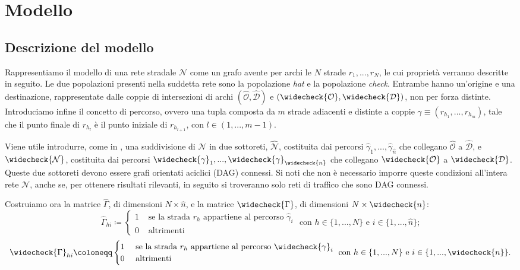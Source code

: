 \section{Modello}
\label{sec:Modello}
\subsection{Descrizione del modello}
\label{subsec:DescModello}

Rappresentiamo il modello di una rete stradale $\mathcal{N}$ come un grafo avente per archi le $N$ strade $r_1,...,r_N$,
le cui proprietà verranno descritte in seguito. Le due popolazioni presenti nella suddetta rete sono 
la popolazione \textit{hat} e la popolazione \textit{check}. Entrambe hanno un'origine e una destinazione, rappresentate
dalle coppie di intersezioni di archi $(\widehat{\mathcal{O}}, \widehat{\mathcal{D}})$ e $(\widecheck{\mathcal{O}}, \widecheck{\mathcal{D}})$, non per forza distinte.
Introduciamo infine il concetto di percorso, ovvero una tupla composta da $m$ strade adiacenti e distinte
a coppie $\gamma\equiv(r_{h_1},...,r_{h_m})$, tale che il punto finale di $r_{h_l}$ è il punto iniziale di 
$r_{h_{l+1}}$, con $l\in(1,...,m-1)$.

Viene utile introdurre, come in \cite[Cap. 2]{MR4911797}, una suddivisione di $\mathcal{N}$ in due sottoreti, $\widehat{\mathcal{N}}$,
costituita dai percorsi $\widehat{\gamma}_1,...,\widehat{\gamma}_{\widehat{n}}$ che collegano $\widehat{\mathcal{O}}$ a $\widehat{\mathcal{D}}$, e
$\widecheck{\mathcal{N}}$, costituita dai percorsi $\widecheck{\gamma}_1,...,\widecheck{\gamma}_{\widecheck{n}}$ che collegano $\widecheck{\mathcal{O}}$ a $\widecheck{\mathcal{D}}$.
Queste due sottoreti devono essere grafi orientati aciclici (DAG) connessi. Si noti che non è necessario imporre queste condizioni
all'intera rete $\mathcal{N}$, anche se, per ottenere risultati rilevanti, in seguito si troveranno solo reti di traffico che sono 
DAG connessi.

Costruiamo ora la matrice $\widehat{\Gamma}$, di dimensioni $N\times\widehat{n}$, e la matrice $\widecheck{\Gamma}$, di dimensioni $N\times\widecheck{n}$:
\[
\widehat{\Gamma}_{hi} \coloneqq
\begin{cases}
    1 &\text{ se la strada } r_h \text{ appartiene al percorso } \widehat{\gamma}_i\\
    0 &\text{ altrimenti}
\end{cases} 
\text{ con } h\in\{1,...,N\} \text{ e } i\in\{1,...,\widehat{n}\}\text{;}
\]
\[
\widecheck{\Gamma}_{hi} \coloneqq
\begin{cases}
    1 &\text{ se la strada } r_h \text{ appartiene al percorso } \widecheck{\gamma}_i\\
    0 &\text{ altrimenti}
\end{cases} 
\text{ con } h\in\{1,...,N\} \text{ e } i\in\{1,...,\widecheck{n}\}\text{.}
\]

